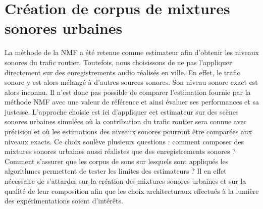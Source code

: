 \chapter{Création de corpus de mixtures sonores urbaines}
\label{chap:corpusSonore}

\noindent{}

\vspace{2cm}

La méthode de la NMF a été retenue comme estimateur afin d'obtenir les niveaux sonores du trafic routier. Toutefois, nous choisissons de ne pas l'appliquer directement sur des enregistrements audio réalisés en ville. En effet, le trafic sonore y est alors mélangé à d'autres sources sonores. Son niveau sonore exact est alors inconnu. Il n'est donc pas possible de comparer l'estimation fournie par la méthode NMF avec une valeur de référence et ainsi évaluer ses performances et sa justesse. L'approche choisie est ici d'appliquer cet estimateur sur des scènes sonores urbaines simulées où la contribution du trafic routier sera connue avec précision et où les estimations des niveaux sonores pourront être comparées aux niveaux exacts. Ce choix soulève plusieurs questions : comment composer des mixtures sonores urbaines aussi réalistes que des enregistrements sonores ? Comment s'assurer que les corpus de sons sur lesquels sont appliqués les algorithmes permettent de tester les limites des estimateurs ?
Il en effet nécessaire de s'attarder sur la création des mixtures sonores urbaines et sur la qualité de leur composition afin que les choix architecturaux effectués à la lumière des expérimentations soient d'intérêts.

